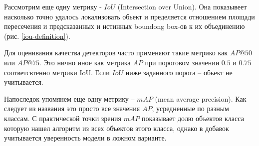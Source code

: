 
Рассмотрим еще одну метрику - $IoU$ (Intersection over Union). Она показывеет насколько точно удалось локализовать обьект и пределяется отношением площади пересечения и предсказанных и истинных boundong box-ов к их объединению (рис. \ref{iou-definition}). 


Для оценивания качества детекторов часто применяют такие метрико как $AP@50$ или $AP@75$. Это нично иное как метрика $AP$ при пороговом значении $0.5$ и $0.75$ соответсвтенно метрики IoU. Если $IoU$ ниже заданного порога -- обьект не учитывается. 

Напоследок упомянем еще одну метрику -- $mAP$ (mean average precision). Как следует из названия это просто все значения $AP$, усредненные по разным классам. С практической точки зрения $mAP$ показывает долю объектов класса которую нашел алгоритм из всех объектов этого класса, однако в добавок учитывается уверенность модели в ложном варианте.